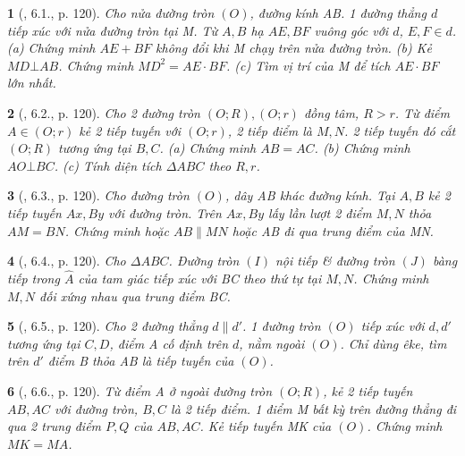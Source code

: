 \documentclass{article}
\newtheorem{baitoan}{}
\begin{document}
\begin{baitoan}[\cite{Binh_boi_duong_Toan_9_tap_1}, 6.1., p. 120]
	Cho nửa đường tròn $(O)$, đường kính AB. 1 đường thẳng $d$ tiếp xúc với nửa đường tròn tại M. Từ $A,B$ hạ $AE,BF$ vuông góc với $d$, $E,F\in d$. (a) Chứng minh $AE + BF$ không đổi khi M chạy trên nửa đường tròn. (b) Kẻ $MD\bot AB$. Chứng minh $MD^2 = AE\cdot BF$. (c) Tìm vị trí của M để tích $AE\cdot BF$ lớn nhất.
\end{baitoan}

\begin{baitoan}[\cite{Binh_boi_duong_Toan_9_tap_1}, 6.2., p. 120]
	Cho 2 đường tròn $(O;R),(O;r)$ đồng tâm, $R > r$. Từ điểm $A\in(O;r)$ kẻ 2 tiếp tuyến với $(O;r)$, 2 tiếp điểm là $M,N$. 2 tiếp tuyến đó cắt $(O;R)$ tương ứng tại $B,C$. (a) Chứng minh $AB = AC$. (b) Chứng minh $AO\bot BC$. (c) Tính diện tích $\Delta ABC$ theo $R,r$.
\end{baitoan}

\begin{baitoan}[\cite{Binh_boi_duong_Toan_9_tap_1}, 6.3., p. 120]
	Cho đường tròn $(O)$, dây AB khác đường kính. Tại $A,B$ kẻ 2 tiếp tuyến $Ax,By$ với đường tròn. Trên $Ax,By$ lấy lần lượt 2 điểm $M,N$ thỏa $AM = BN$. Chứng minh hoặc $AB\parallel MN$ hoặc AB đi qua trung điểm của MN.
\end{baitoan}

\begin{baitoan}[\cite{Binh_boi_duong_Toan_9_tap_1}, 6.4., p. 120]
	Cho $\Delta ABC$. Đường tròn $(I)$ nội tiếp \& đường tròn $(J)$ bàng tiếp trong $\widehat{A}$ của tam giác tiếp xúc với BC theo thứ tự tại $M,N$. Chứng minh $M,N$ đối xứng nhau qua trung điểm BC.
\end{baitoan}

\begin{baitoan}[\cite{Binh_boi_duong_Toan_9_tap_1}, 6.5., p. 120]
	Cho 2 đường thẳng $d\parallel d'$. 1 đường tròn $(O)$ tiếp xúc với $d,d'$ tương ứng tại $C,D$, điểm A cố định trên $d$, nằm ngoài $(O)$. Chỉ dùng êke, tìm trên $d'$ điểm B thỏa AB là tiếp tuyến của $(O)$.
\end{baitoan}

\begin{baitoan}[\cite{Binh_boi_duong_Toan_9_tap_1}, 6.6., p. 120]
	Từ điểm A ở ngoài đường tròn $(O;R)$, kẻ 2 tiếp tuyến $AB,AC$ với đường tròn, $B,C$ là 2 tiếp điểm. 1 điểm M bất kỳ trên đường thẳng đi qua 2 trung điểm $P,Q$ của $AB,AC$. Kẻ tiếp tuyến MK của $(O)$. Chứng minh $MK = MA$.
\end{baitoan}
\end{document}

